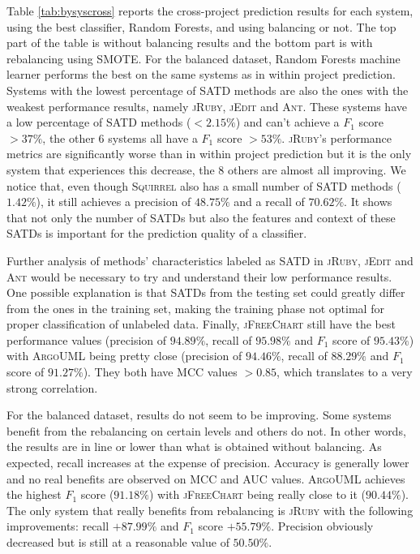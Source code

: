 Table \ref{tab:bysyscross} reports the cross-project prediction results for each system, using the best classifier, Random Forests, and using balancing or not. The top part of the table is without balancing results and the bottom part is with rebalancing using SMOTE. For the balanced dataset, Random Forests machine learner performs the best on the same systems as in within project prediction. Systems with the lowest percentage of SATD methods are also the ones with the weakest performance results, namely \textsc{jRuby}, \textsc{jEdit} and \textsc{Ant}. These systems have a low percentage of SATD methods ($<2.15\%$) and can't achieve a $F_1$ score $>37\%$, the other 6 systems all have a $F_1$ score $>53\%$. \textsc{jRuby}'s performance metrics are significantly worse than in within project prediction but it is the only system that experiences this decrease, the 8 others are almost all improving. We notice that, even though \textsc{Squirrel} also has a small number of SATD methods ($1.42\%$), it still achieves a precision of $48.75\%$ and a recall of $70.62\%$. It shows that not only the number of SATDs but also the features and context of these SATDs is important for the prediction quality of a classifier. 

Further analysis of methods' characteristics labeled as SATD in \textsc{jRuby, jEdit} and \textsc{Ant} would be necessary to try and understand their low performance results. One possible explanation is that SATDs from the testing set could greatly differ from the ones in the training set, making the training phase not optimal for proper classification of unlabeled data. Finally, \textsc{jFreeChart} still have the best performance values (precision of $94.89\%$, recall of $95.98\%$ and $F_1$ score of $95.43\%$) with \textsc{ArgoUML} being pretty close (precision of $94.46\%$, recall of $88.29\%$ and $F_1$ score of $91.27\%$). They both have MCC values $>0.85$, which translates to a very strong correlation.

For the balanced dataset, results do not seem to be improving. Some systems benefit from the rebalancing on certain levels and others do not. In other words, the results are in line or lower than what is obtained without balancing. As expected, recall increases at the expense of precision. Accuracy is generally lower and no real benefits are observed on MCC and AUC values. \textsc{ArgoUML} achieves the highest $F_1$ score ($91.18\%$) with \textsc{jFreeChart} being really close to it ($90.44\%$). The only system that really benefits from rebalancing is \textsc{jRuby} with the following improvements: recall $+87.99\%$ and $F_1$ score $+55.79\%$. Precision obviously decreased but is still at a reasonable value of $50.50\%$. 

